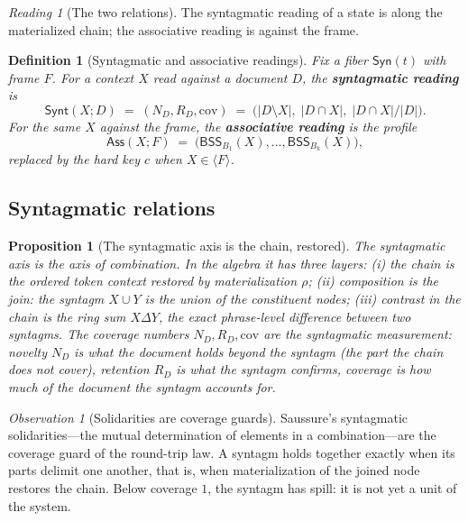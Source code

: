 \documentclass[11pt,a4paper]{article}
\newtheorem{definition}[principle]{Definition}
\newtheorem{proposition}[principle]{Proposition}
\theoremstyle{remark}
\newtheorem{observation}[principle]{Observation}
\newtheorem{reading}[principle]{Reading}
\newcommand{\xor}{\ensuremath{\Delta}}                   %
\newcommand{\BSS}{\ensuremath{\mathsf{BSS}}}             %
\newcommand{\spanof}[1]{\ensuremath{\langle #1\rangle}}  %
\newcommand{\Mat}{\ensuremath{\rho}}                     %
\newcommand{\Cov}{\ensuremath{\mathrm{cov}}}             %
\newcommand{\Sync}{\ensuremath{\mathsf{Syn}}}            %
\newcommand{\Synt}{\ensuremath{\mathsf{Synt}}}           %
\newcommand{\Ass}{\ensuremath{\mathsf{Ass}}}             %
\begin{document}
\begin{reading}[The two relations]
\label{read:relations}
The syntagmatic reading of a state is along the materialized chain; the
associative reading is against the frame.
\end{reading}

\begin{definition}[Syntagmatic and associative readings]
\label{def:readings}
Fix a fiber $\Sync(t)$ with frame $F$. For a context $X$ read against a
document $D$, the \textbf{syntagmatic reading} is
\[
  \Synt(X; D) \;=\; (N_D, R_D, \Cov)
  \;=\;
  \bigl(|D \setminus X|,\; |D \cap X|,\; |D \cap X|/|D|\bigr).
\]
For the same $X$ against the frame, the \textbf{associative reading} is the
profile
\[
  \Ass(X; F) \;=\; \bigl(\BSS_{B_1}(X), \dots, \BSS_{B_k}(X)\bigr),
\]
replaced by the hard key $c$ when $X \in \spanof{F}$.
\end{definition}

\subsection{Syntagmatic relations}
\label{sec:syntagmatic}

\begin{proposition}[The syntagmatic axis is the chain, restored]
\label{prop:syntagmatic}
The syntagmatic axis is the axis of combination. In the algebra it has three
layers: (i) the \emph{chain} is the ordered token context restored by
materialization $\Mat$; (ii) \emph{composition} is the join: the syntagm
$X \cup Y$ is the union of the constituent nodes; (iii) \emph{contrast in
the chain} is the ring sum $X \xor Y$, the exact phrase-level difference
between two syntagms. The coverage numbers $N_D, R_D, \Cov$ are the
syntagmatic measurement: novelty $N_D$ is what the document holds beyond the
syntagm (the part the chain does not cover), retention $R_D$ is what the
syntagm confirms, coverage is how much of the document the syntagm accounts
for.
\end{proposition}

\begin{observation}[Solidarities are coverage guards]
Saussure's syntagmatic solidarities---the mutual determination of elements in
a combination---are the coverage guard of the round-trip law. A syntagm holds
together exactly when its parts delimit one another, that is, when
materialization of the joined node restores the chain. Below coverage $1$,
the syntagm has spill: it is not yet a unit of the system.
\end{observation}
\end{document}
